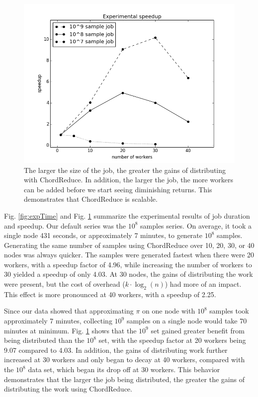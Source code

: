 \begin{figure}
	\includegraphics[width=\linewidth]{figs/expSpeed}
	\caption{The larger the size of the job, the greater the gains of distributing with ChordReduce.  In addition, the larger the job, the more workers can be added before we start seeing diminishing returns.  This demonstrates that ChordReduce is scalable.}
	\label{fig:expSpeed}
\end{figure}

Fig. \ref{fig:expTime} and Fig. \ref{fig:expSpeed} summarize the experimental results of job duration and speedup.  Our default series was the $10^{8}$ samples series.  On average, it took a single node 431 seconds, or approximately 7 minutes, to generate $10^{8}$ samples.  Generating the same number of samples using ChordReduce over 10, 20, 30, or 40 nodes was always quicker.  The samples were generated fastest when there were 20 workers, with a speedup factor of 4.96, while increasing the number of workers to 30 yielded a speedup of only 4.03.  At 30 nodes, the gains of distributing the work were present, but the cost of overhead ($k \cdot \log_{2}(n)$) had more of an impact.  This effect is more pronounced at 40 workers, with a speedup of 2.25.

Since our data showed that approximating $\pi$ on one node with $10^{8}$ samples took approximately 7 minutes, collecting $10^{9}$ samples on a single node would take 70 minutes at minimum.  Fig. \ref{fig:expSpeed} shows that the $10^{9}$ set gained greater benefit from being distributed than the $10^{8}$ set, with the speedup factor at 20 workers being 9.07 compared to 4.03.  In addition, the gains of distributing work further increased at 30 workers and only began to decay at 40 workers, compared with the $10^{8}$ data set, which began its drop off at 30 workers. This behavior demonstrates that the larger the job being distributed, the greater the gains of distributing the work using ChordReduce.

